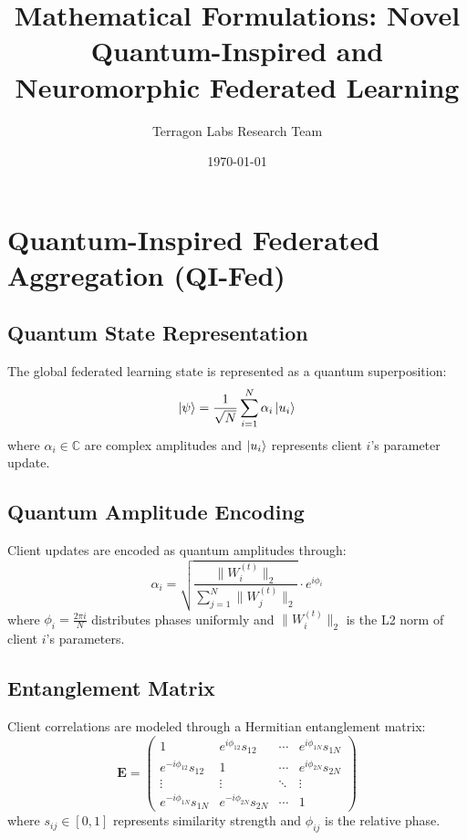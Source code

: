 \documentclass[12pt,a4paper]{article}
\title{Mathematical Formulations: Novel Quantum-Inspired and Neuromorphic Federated Learning}
\author{Terragon Labs Research Team}
\date{\today}
\begin{document}
\maketitle

\section{Quantum-Inspired Federated Aggregation (QI-Fed)}

\subsection{Quantum State Representation}

The global federated learning state is represented as a quantum superposition:
\begin{equation}
\ket{\psi} = \frac{1}{\sqrt{N}} \sum_{i=1}^{N} \alpha_i \ket{u_i}
\end{equation}
where $\alpha_i \in \mathbb{C}$ are complex amplitudes and $\ket{u_i}$ represents client $i$'s parameter update.

\subsection{Quantum Amplitude Encoding}

Client updates are encoded as quantum amplitudes through:
\begin{equation}
\alpha_i = \sqrt{\frac{\|W_i^{(t)}\|_2}{\sum_{j=1}^N \|W_j^{(t)}\|_2}} \cdot e^{i\phi_i}
\end{equation}
where $\phi_i = \frac{2\pi i}{N}$ distributes phases uniformly and $\|W_i^{(t)}\|_2$ is the L2 norm of client $i$'s parameters.

\subsection{Entanglement Matrix}

Client correlations are modeled through a Hermitian entanglement matrix:
\begin{equation}
\mathbf{E} = \begin{pmatrix}
1 & e^{i\phi_{12}} s_{12} & \cdots & e^{i\phi_{1N}} s_{1N} \\
e^{-i\phi_{12}} s_{12} & 1 & \cdots & e^{i\phi_{2N}} s_{2N} \\
\vdots & \vdots & \ddots & \vdots \\
e^{-i\phi_{1N}} s_{1N} & e^{-i\phi_{2N}} s_{2N} & \cdots & 1
\end{pmatrix}
\end{equation}
where $s_{ij} \in [0,1]$ represents similarity strength and $\phi_{ij}$ is the relative phase.
\end{document}
